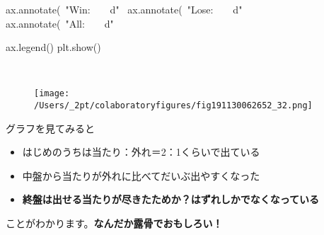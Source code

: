 \begin{paracol}{2}
\begin{codeCell}[escapechar=~]
ax.annotate(~\textcolor{mtk25}{"Win:}~~~~\textcolor{mtk25}{d"}~ %
ax.annotate(~\textcolor{mtk25}{"Lose:}~~~~\textcolor{mtk25}{d"}~ %
ax.annotate(~\textcolor{mtk25}{"All:}~~~~\textcolor{mtk25}{d"}~ %


ax.legend()
plt.show()
\end{codeCell}
\end{paracol}

\begin{paracol}{2}
\begin{cellExecute}[escapechar=~]
~~
\end{cellExecute}
\switchcolumn
\begin{resultCell}[escapechar=~]
\end{resultCell}
\end{paracol}

\begin{figure}[H]
\centering
\texttt{[image: /Users/\_2pt/colaboratoryfigures/fig191130062652\_32.png]}
\end{figure}
\par グラフを見てみると
\begin{itemize}

\item はじめのうちは当たり：外れ＝2：1くらいで出ている
\item 中盤から当たりが外れに比べてだいぶ出やすくなった
\item \textbf{終盤は出せる当たりが尽きたためか？はずれしかでなくなっている}

\end{itemize}
\par ことがわかります。\textbf{なんだか露骨でおもしろい！}
